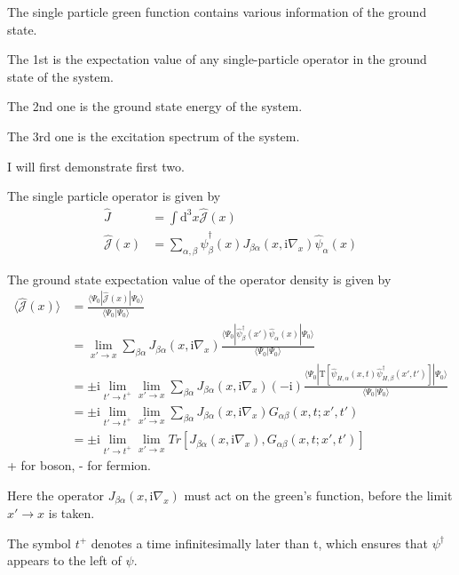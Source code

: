 The single particle green function contains various information of the ground state.

The 1st is the expectation value of any single-particle operator in the ground state of the system.

The 2nd one is the ground state energy of the system.

The 3rd one is the excitation spectrum of the system.

I will first demonstrate first two.

The single particle operator is given by
\begin{align}
\hat{J}&=\int \mathrm{d}^3x \hat{\mathcal{J}}(x) \nonumber \\
\hat{\mathcal{J}}(x) &=\sum_{\alpha,\beta}\hat \psi^{\dagger}_{\beta}(x)J_{\beta\alpha}(x,\mathrm{i}\nabla_x)\hat \psi_{\alpha}(x) \nonumber
\end{align}

The ground state expectation value of the operator density is given by 
\begin{align}
\langle\hat{\mathcal{J}}(x)\rangle&=\frac{\langle\Psi_0|\hat{\mathcal{J}}(x)|\Psi_0\rangle}{\langle\Psi_0|\Psi_0\rangle} \nonumber \\
&= \lim_{x'\rightarrow x}\sum_{\beta\alpha}J_{\beta\alpha}(x,\mathrm{i}\nabla_x)\frac{\langle\Psi_0|\hat \psi^{
\dagger}_{\beta}(x')\hat \psi_{\alpha}(x)|\Psi_0\rangle}{\langle\Psi_0|\Psi_0\rangle} \nonumber \\
&=\pm \mathrm{i} \lim_{t'\rightarrow t^+} \lim_{x'\rightarrow x}\sum_{\beta\alpha}J_{\beta\alpha}(x,\mathrm{i}\nabla_x)(-\mathrm{i})\frac{\langle\Psi_0|\mathrm{T}[\hat \psi_{H,\alpha}(x,t)\hat \psi^{
\dagger}_{H,\beta}(x',t')]|\Psi_0\rangle}{\langle\Psi_0|\Psi_0\rangle} \nonumber \\
&=\pm \mathrm{i} \lim_{t'\rightarrow t^+} \lim_{x'\rightarrow x}\sum_{\beta\alpha}J_{\beta\alpha}(x,\mathrm{i}\nabla_x)G_{\alpha\beta}(x,t;x',t') \nonumber \\
&=\pm \mathrm{i} \lim_{t'\rightarrow t^+} \lim_{x'\rightarrow x} Tr[J_{\beta\alpha}(x,\mathrm{i}\nabla_x),G_{\alpha\beta}(x,t;x',t')] \nonumber
\end{align}
+ for boson, - for fermion.

Here the operator $J_{\beta\alpha}(x,\mathrm{i}\nabla_x)$ must act on the green's function, before the limit $x'\rightarrow x$ is taken.

The symbol $t^+$ denotes a time infinitesimally later than t, which ensures that $\psi^{\dagger}$ appears to the left of $\psi$.

